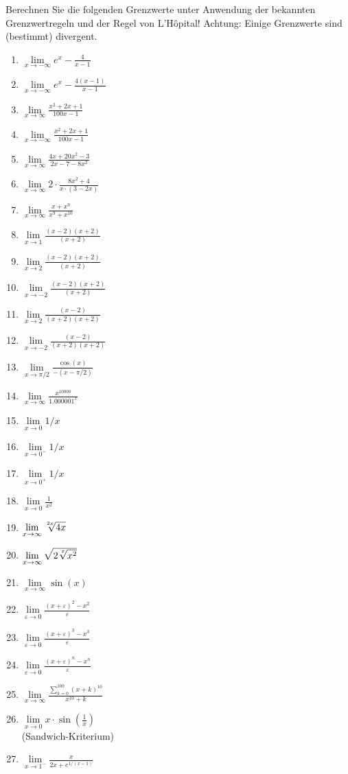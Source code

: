 \item Berechnen Sie die folgenden Grenzwerte unter Anwendung der bekannten Grenzwertregeln und der Regel von L'Hôpital! Achtung: Einige Grenzwerte sind (bestimmt) divergent.

\begin{multicols}{3}
	\begin{enumerate}[label=(\arabic*)]
		\item $\lim\limits_{x \to -\infty} e^x - \frac{4}{x-1}$
		\item $\lim\limits_{x \to -\infty} e^x - \frac{4(x-1)}{x-1}$
		\item $\lim\limits_{x \to \infty} \frac{x^2+2x+1}{100x-1}$
		\item $\lim\limits_{x \to -\infty} \frac{x^2+2x+1}{100x-1}$
		\item $\lim\limits_{x \to \infty} \frac{4x+20x^2-3}{2x-7-8x^2}$
		\item $\lim\limits_{x \to \infty} 2\cdot\frac{8x^2+4}{x\cdot (3-2x)}$
		\item $\lim\limits_{x \to \infty} \frac{x+x^9}{x^9+x^{10}}$
		\item $\lim\limits_{x \to 1} \frac{(x-2)(x+2)}{(x+2)}$
		\item $\lim\limits_{x \to 2} \frac{(x-2)(x+2)}{(x+2)}$
		\item $\lim\limits_{x \to -2} \frac{(x-2)(x+2)}{(x+2)}$
		\item $\lim\limits_{x \to 2} \frac{(x-2)}{(x+2)(x+2)}$
		\item $\lim\limits_{x \to -2} \frac{(x-2)}{(x+2)(x+2)}$
		\item $\lim\limits_{x \to \pi/2} \frac{\cos(x)}{-(x-\pi/2)}$
		\item $\lim\limits_{x \to \infty} \frac{x^{10000}}{1.000001^x}$
		\item $\lim\limits_{x \to 0} 1/x$
		\item $\lim\limits_{x \to 0^{-}} 1/x$
		\item $\lim\limits_{x \to 0^{+}} 1/x$
		\item $\lim\limits_{x \to 0} \frac{1}{x^2}$
		\item $\lim\limits_{x \to \infty} \nroot{2x}{4x}$
		\item $\lim\limits_{x \to \infty} \sqrt{2\nroot{x}{x^2}}$
		\item $\lim\limits_{x \to \infty} \sin(x)$
		\item $\lim\limits_{\varepsilon \to 0} \frac{(x+\varepsilon)^2-x^2}{\varepsilon}$
		\item $\lim\limits_{\varepsilon \to 0} \frac{(x+\varepsilon)^3-x^3}{\varepsilon}$
		\item $\lim\limits_{\varepsilon \to 0} \frac{(x+\varepsilon)^n-x^n}{\varepsilon}$
		\item $\lim\limits_{x \to \infty} \frac{\sum_{k=0}^{100} (x+k)^{10}}{x^{10}+k}$
		\item $\lim\limits_{x \to 0} x\cdot\sin(\frac{1}{x})$ \\ (Sandwich-Kriterium)
		\item $\lim\limits_{x \to 1^{-}} \frac{x}{2x+e^{1/(x-1)}}$
	\end{enumerate}
\end{multicols}
